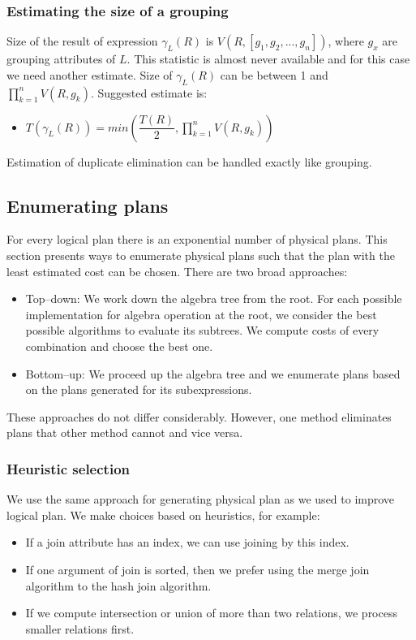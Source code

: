\subsubsection{Estimating the size of a grouping}
Size of the result of expression $\gamma_L(R)$ is $V(R,[g_1,g_2,...,g_n])$, where $g_x$ are grouping attributes of $L$. This statistic is almost never available and for this case we need another estimate. Size of $\gamma_L(R)$ can be between 1 and $\prod_{k=1}^{n}{V(R,g_k)}$. Suggested estimate is:
\begin{itemize}
\item $T(\gamma_L(R))=min(\dfrac{T(R)}{2},\prod_{k=1}^{n}{V(R,g_k)})$
\end{itemize}
Estimation of duplicate elimination can be handled exactly like grouping.

\subsection{Enumerating plans}
For every logical plan there is an exponential number of physical plans. This section presents ways to enumerate physical plans such that the plan with the least estimated cost can be chosen. There are two broad approaches:
\begin{itemize}
\item Top--down: We work down the algebra tree from the root. For each possible implementation for algebra operation at the root, we consider the best possible algorithms to evaluate its subtrees. We compute costs of every combination and choose the best one.
\item Bottom--up: We proceed up the algebra tree and we enumerate plans based on the plans generated for its subexpressions.
\end{itemize}
These approaches do not differ considerably. However, one method eliminates plans that other method cannot and vice versa.
\subsubsection{Heuristic selection}

We use the same approach for generating physical plan as we used to improve logical plan. We make choices based on heuristics, for example:

\begin{itemize}

\item If a join attribute has an index, we can use joining by this index.
\item If one argument of join is sorted, then we prefer using the merge join algorithm to the hash join algorithm.
\item If we compute intersection or union of more than two relations, we process smaller relations first.
\end{itemize}

